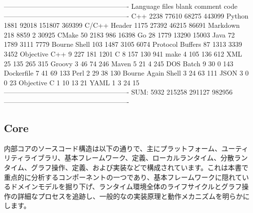 \begin{content}
\begin{leftbar}
\begin{python}[caption={TensorFlowコード統計}]
-------------------------------------------------------
Language             files    blank    comment    code
-------------------------------------------------------
C++                   2238    77610     68275    443099
Python                1881    92018    151807    369399
C/C++ Header          1175    27392     46215     86691
Markdown               218     8859         2     30925
CMake                   50     2183       986     16398
Go                      28     1779     13290     15003
Java                    72     1789      3111      7779
Bourne Shell           103     1487      3105      6074
Protocol Buffers        87     1313      3339      3452
Objective C++            9      227       181      1201
C                        8      157       130       941
make                     4      105       136       612
XML                     25      135       265       315
Groovy                   3       46        74       246
Maven                    5       21         4       245
DOS Batch                9       30         0       143
Dockerfile               7       41        69       133
Perl                     2       29        38       130
Bourne Again Shell       3       24        63       111
JSON                     3        0         0        23
Objective C              1       10        13        21
YAML                     1        3        24        15
-------------------------------------------------------
SUM:                  5932   215258    291127    982956
-------------------------------------------------------
\end{python}
\end{leftbar}

\subsection{Core}

内部コアのソースコード構造は以下の通りで、主にプラットフォーム、ユーティリティライブラリ、基本フレームワーク、定義、ローカルランタイム、分散ランタイム、グラフ操作、定義、および実装などで構成されています。これは本書で重点的に分析するコンポーネントの一つであり、基本フレームワークに隠れているドメインモデルを掘り下げ、ランタイム環境全体のライフサイクルとグラフ操作の詳細なプロセスを追跡し、一般的なの実装原理と動作メカニズムを明らかにします。


\end{content}
